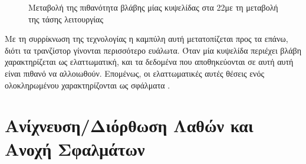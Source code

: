 \begin{figure}[h]
    \centering
    \caption[Μεταβολή της πιθανότητα βλάβης μίας  κυψελίδας στα 22\nm με τη μεταβολή της τάσης λειτουργίας]{Μεταβολή της πιθανότητα βλάβης μίας  κυψελίδας στα 22\nm με τη μεταβολή της τάσης λειτουργίας \cite{ferreron2014block}}
    \label{fig:chap3_22nm_pfail}
\end{figure}

Με τη συρρίκνωση της τεχνολογίας η καμπύλη αυτή μετατοπίζεται προς τα επάνω, διότι τα τρανζίστορ γίνονται περισσότερο ευάλωτα. Όταν μία κυψελίδα περιέχει βλάβη χαρακτηρίζεται ως ελαττωματική, και τα δεδομένα που αποθηκεύονται σε αυτή αυτή είναι πιθανό να αλλοιωθούν. Επομένως, οι ελαττωματικές αυτές θέσεις ενός ολοκληρωμένου χαρακτηρίζονται ως σφάλματα \cite{nikolosTesting}.


\section{Ανίχνευση/Διόρθωση Λαθών και Ανοχή Σφαλμάτων}
\label{chap3_FaultTaulerance}

